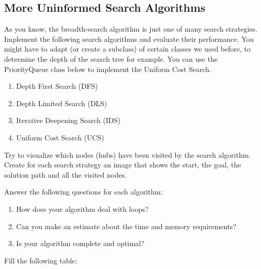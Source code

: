 \documentclass[11pt]{article}
\providecommand{\tightlist}{%
      \setlength{\itemsep}{0pt}\setlength{\parskip}{0pt}}
\begin{document}
    \hypertarget{more-uninformed-search-algorithms}{%
\subsection{More Uninformed Search
Algorithms}\label{more-uninformed-search-algorithms}}

As you know, the breadth-search algorithm is just one of many search
strategies. Implement the following search algorithms and evaluate their
performance. You might have to adapt (or create a subclass) of certain
classes we used before, to determine the depth of the search tree for
example. You can use the PriorityQueue class below to implement the
Uniform Cost Search.

\begin{enumerate}
\def\labelenumi{\arabic{enumi}.}
\tightlist
\item
  Depth First Search (DFS)
\item
  Depth Limited Search (DLS)
\item
  Iterative Deepening Search (IDS)
\item
  Uniform Cost Search (UCS)
\end{enumerate}

Try to visualize which nodes (hubs) have been visited by the search
algorithm. Create for each search strategy an image that shows the
start, the goal, the solution path and all the visited nodes.

Answer the following questions for each algorithm:

\begin{enumerate}
\def\labelenumi{\arabic{enumi}.}
\tightlist
\item
  How does your algorithm deal with loops?
\item
  Can you make an estimate about the time and memory requirements?
\item
  Is your algorithm complete and optimal?
\end{enumerate}

Fill the following table:
\end{document}
